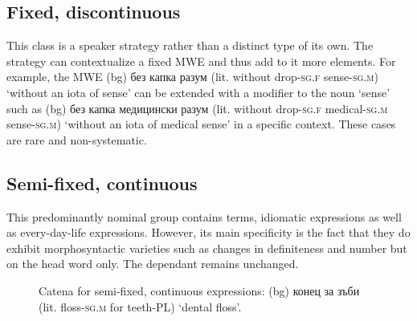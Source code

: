 \documentclass[output=paper,colorlinks,citecolor=brown]{langscibook}
\begin{document}
\subsection{Fixed, discontinuous}

This class is a speaker strategy rather than a distinct type of its own. The strategy can contextualize a fixed MWE and thus add to it more elements. For example, the MWE 
(bg) {без капка разум } (lit. without drop-\textsc{sg.f} sense-\textsc{sg.m}) {`without an iota of sense'}
can be extended with a modifier to the noun `sense' such as 
(bg) {без капка медицински разум } (lit. without drop-\textsc{sg.f} medical-\textsc{sg.m} sense-\textsc{sg.m}) {`without an iota of medical sense'}
in a specific context. These cases are rare and non-systematic.

\subsection{Semi-fixed, continuous}

This predominantly nominal group contains terms, idiomatic expressions as well as every-day-life expressions. However, its main specificity is the fact that they do exhibit morphosyntactic varieties such as changes in definiteness and number but on the head word only. The dependant remains unchanged.

\begin{figure}
  \begin{center}  

  
  \caption{Catena for semi-fixed, continuous expressions:
  (bg) {конец за зъби } (lit. floss-\textsc{sg.m} for teeth-PL) {`dental floss'}.}
  \label{fig:SemiFixCont01}
  \end{center}  

\end{figure}
\end{document}
